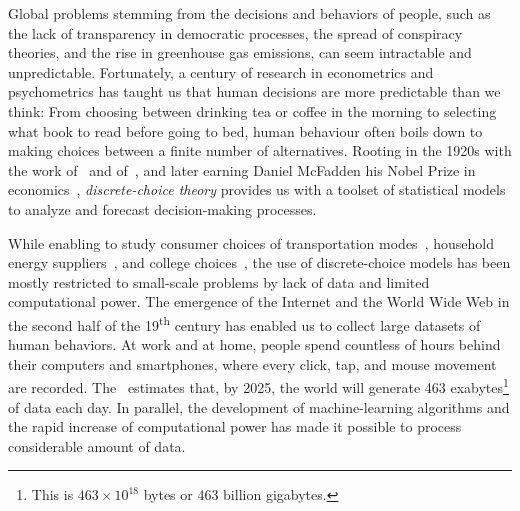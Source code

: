 Global problems stemming from the decisions and behaviors of people, such as the lack of transparency in democratic processes, the spread of conspiracy theories, and the rise in greenhouse gas emissions, can seem intractable and unpredictable.
Fortunately, a century of research in econometrics and psychometrics has taught us that human decisions are more predictable than we think:
From choosing between drinking tea or coffee in the morning to selecting what book to read before going to bed, human behaviour often boils down to making choices between a finite number of alternatives.
Rooting in the 1920s with the work of~\citet{thurstone1927law} and of~\citet{zermelo1928berechnung}, and later earning Daniel McFadden his Nobel Prize in economics~\citep{mcfadden2001economic}, \emph{discrete-choice theory} provides us with a toolset of statistical models to analyze and forecast decision-making processes.

While enabling to study consumer choices of transportation modes~\citep{ben1973structure,mcfadden1974measurement}, household energy suppliers~\citep{goett2000customers}, and college choices~\citep{fuller1982new}, the use of discrete-choice models has been mostly restricted to small-scale problems by lack of data and limited computational power.
The emergence of the Internet and the World Wide Web in the second half of the 19\textsuperscript{th} century has enabled us to collect large datasets of human behaviors.
At work and at home, people spend countless of hours behind their computers and smartphones, where every click, tap, and mouse movement are recorded.
The~\citet{wef2019data} estimates that, by 2025, the world will generate 463 exabytes\footnote{This is $463 \times 10^{18}$ bytes or 463 billion gigabytes.} of data each day.
In parallel, the development of machine-learning algorithms and the rapid increase of computational power has made it possible to process considerable amount of data.

